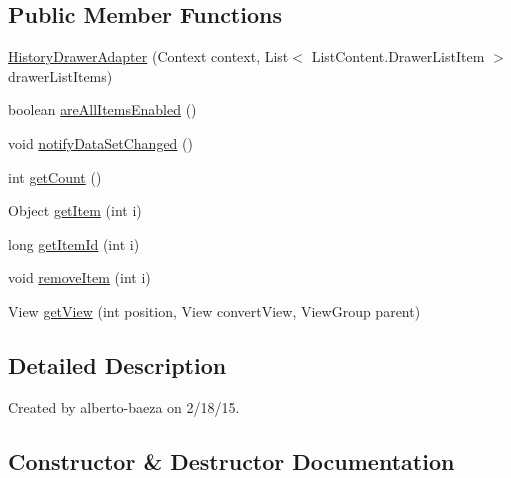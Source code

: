 \subsection*{Public Member Functions}
\begin{DoxyCompactItemize}
\item 
\hyperlink{classandroid_1_1app_1_1printerapp_1_1history_1_1_history_drawer_adapter_a4347338f51e3b0111cde94f2a92e02e8}{History\+Drawer\+Adapter} (Context context, List$<$ List\+Content.\+Drawer\+List\+Item $>$ drawer\+List\+Items)
\item 
boolean \hyperlink{classandroid_1_1app_1_1printerapp_1_1history_1_1_history_drawer_adapter_a5635f09e2539f91f94d5538e16de50eb}{are\+All\+Items\+Enabled} ()
\item 
void \hyperlink{classandroid_1_1app_1_1printerapp_1_1history_1_1_history_drawer_adapter_afa986e05174f212eecba313cb260c35a}{notify\+Data\+Set\+Changed} ()
\item 
int \hyperlink{classandroid_1_1app_1_1printerapp_1_1history_1_1_history_drawer_adapter_aff367cf77c1a33773cc3f8ab43551df8}{get\+Count} ()
\item 
Object \hyperlink{classandroid_1_1app_1_1printerapp_1_1history_1_1_history_drawer_adapter_a06c085ba1f6fce42ab78f9f56ab1bf27}{get\+Item} (int i)
\item 
long \hyperlink{classandroid_1_1app_1_1printerapp_1_1history_1_1_history_drawer_adapter_abc4bbbb479f910e7398ed9d9d9882da0}{get\+Item\+Id} (int i)
\item 
void \hyperlink{classandroid_1_1app_1_1printerapp_1_1history_1_1_history_drawer_adapter_aeeb28e43e98674ae2a3e45c24f420d13}{remove\+Item} (int i)
\item 
View \hyperlink{classandroid_1_1app_1_1printerapp_1_1history_1_1_history_drawer_adapter_a029923169917f639699c41fcc6f9ea14}{get\+View} (int position, View convert\+View, View\+Group parent)
\end{DoxyCompactItemize}


\subsection{Detailed Description}
Created by alberto-\/baeza on 2/18/15. 

\subsection{Constructor \& Destructor Documentation}
\mbox{\label{classandroid_1_1app_1_1printerapp_1_1history_1_1_history_drawer_adapter_a4347338f51e3b0111cde94f2a92e02e8}} 
